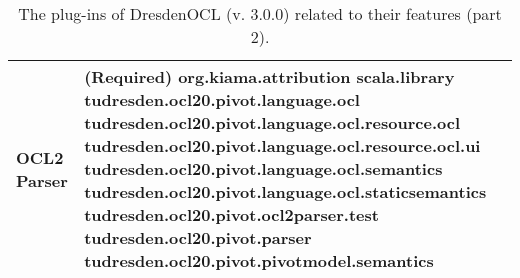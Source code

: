 \begin{table}[h]
\begin{tabular}{|p{4cm}|p{10cm}|}
    \textbf{OCL2 Parser} &
    (Required)\newline
    org.kiama.attribution\newline
    scala.library\newline
    tudresden.ocl20.pivot.language.ocl\newline
    tudresden.ocl20.pivot.language.ocl.resource.ocl\newline
    tudresden.ocl20.pivot.language.ocl.resource.ocl.ui\newline
    tudresden.ocl20.pivot.language.ocl.semantics\newline
    tudresden.ocl20.pivot.language.ocl.staticsemantics\newline
    tudresden.ocl20.pivot.ocl2parser.test\newline
    tudresden.ocl20.pivot.parser\newline
    tudresden.ocl20.pivot.pivotmodel.semantics\\
    \hline
\end{tabular}
\caption{The plug-ins of DresdenOCL (v. 3.0.0) related to their features (part 2).}
\end{table}



